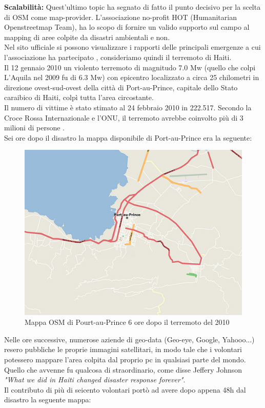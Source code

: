\textbf{Scalabilità:} Quest'ultimo topic ha segnato di fatto il punto decisivo per la scelta di OSM come map-provider. L'associazione no-profit HOT (Humanitarian Openstreetmap Team), ha lo scopo di fornire un valido supporto sul campo al mapping di aree colpite da disastri ambientali e non.\\
Nel sito ufficiale si possono visualizzare i rapporti delle principali emergenze a cui l'associazione ha partecipato \cite{HOT_PROJECT} , consideriamo quindi il terremoto di Haiti.\\
Il 12 gennaio 2010 un violento terremoto di magnitudo 7.0 Mw (quello che colpi L'Aquila nel 2009 fu di 6.3 Mw) con epicentro localizzato a circa 25 chilometri in direzione ovest-sud-ovest della città di Port-au-Prince, capitale dello Stato caraibico di Haiti, colpì tutta l'area circostante.\\
Il numero di vittime è stato stimato al 24 febbraio 2010 in 222.517. Secondo la Croce Rossa Internazionale e l'ONU, il terremoto avrebbe coinvolto più di 3 milioni di persone \cite{WIKI_HAITI}.\\ Sei ore dopo il disastro la mappa disponibile di Port-au-Prince era la seguente:

\begin{figure}[H]
	\centering
	\includegraphics[scale=0.6]{OpenStreetMap/haiti_prima.jpg}
	\caption{Mappa OSM di Pourt-au-Prince 6 ore dopo il terremoto del 2010}
	\label{fig: haiti_day0}
\end{figure}
\newpage
Nelle ore successive, numerose aziende di geo-data (Geo-eye, Google, Yahooo...) resero pubbliche le proprie immagini satellitari, in modo tale che i volontari potessero mappare l'area colpita dal proprio pc in qualsiasi parte del mondo. \\
Quello che avvenne fu qualcosa di straordinario, come disse Jeffery Johnson \textit{"What we did in Haiti changed disaster response forever"}. \\
Il contributo di più di seicento volontari portò ad avere dopo appena 48h dal disastro la seguente mappa:

